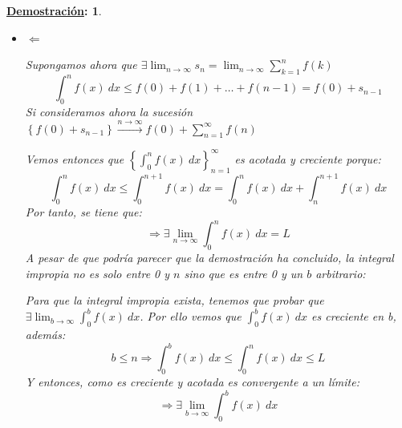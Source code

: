 \documentclass[10pt,a4paper,openright]{book}
\theoremstyle{break}
\newtheorem*{demo}{\underline{Demostración}:}
\newcommand{\dif}[1]{\ d#1}
\begin{document}
\begin{demo}
\begin{itemize}

Si ahora suponemos que lo que es convergente es la integral, tenemos que:
$$ \int_{0}^{+\infty} f(x)\dif{x} \mbox{ es convergente } \Rightarrow \exists \lim_{n \to \infty} \int_{0}^{n} f(x)\dif{x} = L$$
De este modo, recuperando la desigualdad de antes vemos que:
$$\underbrace{f(1)+f(2) + \ldots + f(n)}_{s_n} \leq \int_{0}^{n} f(x)\dif{x} \leq  L $$
Por tanto, como $s_n$ es creciente y está acotada superiormente, tenemos que es convergente, es decir:
$$\exists \lim_{n \to \infty} s_n = \sum_{n=1}^{\infty} f(n)$$

\item $\Leftarrow$

Supongamos ahora que $\exists \displaystyle \lim_{n \to \infty} s_n = \lim_{n \to \infty} \sum_{k=1}^{n} f(k)$
$$\int_{0}^{n} f(x)\dif{x} \leq f(0)+f(1) + \ldots + f(n-1) = f(0) + s_{n-1}$$
Si consideramos ahora la sucesión $\left\lbrace f(0) + s_{n-1}\right\rbrace \xrightarrow{n\rightarrow\infty} f(0) + \sum_{n=1}^{\infty} f(n)$

Vemos entonces que $\left\lbrace\displaystyle\int_{0}^{n} f(x) \dif{x}\right\rbrace^\infty_{n=1}$ es acotada y creciente  porque:
$$\int_{0}^{n} f(x)\dif{x} \leq \int_{0}^{n+1} f(x)\dif{x} = \int_{0}^{n} f(x)\dif{x} + \int_{n}^{n+1} f(x)\dif{x}$$
Por tanto, se tiene que:
$$\Rightarrow \exists \lim_{n \to \infty} \int_{0}^{n} f(x) \dif{x} = L$$
A pesar de que podría parecer que la demostración ha concluido, la integral impropia no es solo entre 0 y $n$ sino que es entre 0 y un $b$ arbitrario:

Para que la integral impropia exista, tenemos que probar que $\displaystyle \exists\lim_{b \to \infty} \int_{0}^{b} f(x)\dif{x} $. Por ello vemos que $\displaystyle \int_{0}^{b} f(x) \dif{x}$ es creciente en b, además:
$$b\leq n\Rightarrow \int_{0}^{b} f(x)\dif{x} \leq \int_{0}^{n} f(x)\dif{x} \leq L$$
Y entonces, como es creciente y acotada es convergente a un límite:
$$\Rightarrow \exists \lim_{b \to \infty} \int_{0}^{b} f(x) \dif{x}$$
\end{itemize}
\end{demo}
\end{document}
